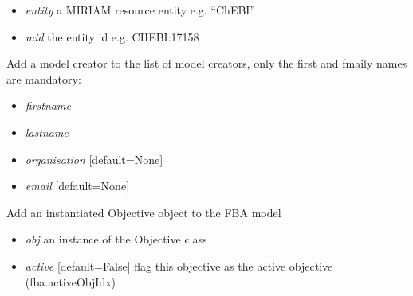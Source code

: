 \documentclass[a4paper,11pt,english]{sphinxmanual}
\begin{document}
\begin{fulllineitems}
\begin{fulllineitems}
\begin{itemize}
\item {} 
\emph{entity} a MIRIAM resource entity e.g. ``ChEBI''

\item {} 
\emph{mid} the entity id e.g. CHEBI:17158

\end{itemize}

\end{fulllineitems}


\begin{fulllineitems}
\label{modules_doc:cbmpy.CBModel.Model.addModelCreator}
Add a model creator to the list of model creators, only the first and fmaily names are mandatory:
\begin{itemize}
\item {} 
\emph{firstname}

\item {} 
\emph{lastname}

\item {} 
\emph{organisation} {[}default=None{]}

\item {} 
\emph{email}  {[}default=None{]}

\end{itemize}

\end{fulllineitems}


\begin{fulllineitems}
\label{modules_doc:cbmpy.CBModel.Model.addObjective}
Add an instantiated Objective object to the FBA model
\begin{itemize}
\item {} 
\emph{obj} an instance of the Objective class

\item {} 
\emph{active} {[}default=False{]} flag this objective as the active objective (fba.activeObjIdx)

\end{itemize}

\end{fulllineitems}



\end{fulllineitems}
\end{document}
